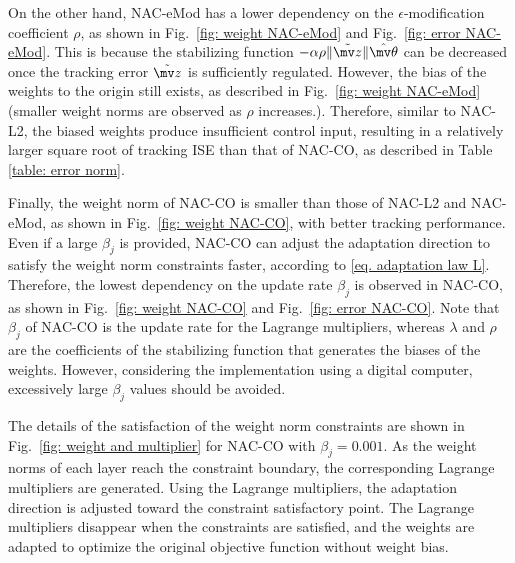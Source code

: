\documentclass[letterpaper, 10 pt, conference]{ieeeconf}  %
\begin{document}
On the other hand, NAC-eMod has a lower dependency on the $\epsilon$-modification coefficient $\rho$, as shown in Fig.~\ref{fig: weight NAC-eMod} and Fig.~\ref{fig: error NAC-eMod}.
This is because the stabilizing function $-\alpha\rho\Vert\tilde {\mv z}\Vert{\hat{\mv\theta}}$ can be decreased once the tracking error $\tilde {\mv z}$ is sufficiently regulated.
However, the bias of the weights to the origin still exists, as described in Fig.~\ref{fig: weight NAC-eMod} (\ie smaller weight norms are observed as $\rho$ increases.).
Therefore, similar to NAC-L2, the biased weights produce insufficient control input, resulting in a relatively larger square root of tracking ISE than that of NAC-CO, as described in Table \ref{table: error norm}.

Finally, the weight norm of NAC-CO is smaller than those of NAC-L2 and NAC-eMod, as shown in Fig.~\ref{fig: weight NAC-CO}, with better tracking performance.
Even if a large $\beta_j$ is provided, NAC-CO can adjust the adaptation direction to satisfy the weight norm constraints faster, according to \eqref{eq. adaptation law L}.
Therefore, the lowest dependency on the update rate $\beta_j$ is observed in NAC-CO, as shown in Fig.~\ref{fig: weight NAC-CO} and Fig.~\ref{fig: error NAC-CO}.
Note that $\beta_j$ of NAC-CO is the update rate for the Lagrange multipliers, whereas $\lambda$ and $\rho$ are the coefficients of the stabilizing function that generates the biases of the weights.
However, considering the implementation using a digital computer, excessively large $\beta_j$ values should be avoided.

The details of the satisfaction of the weight norm constraints are shown in Fig.~\ref{fig: weight and multiplier} for NAC-CO with $\beta_j=0.001$.
As the weight norms of each layer reach the constraint boundary, the corresponding Lagrange multipliers are generated.
Using the Lagrange multipliers, the adaptation direction is adjusted toward the constraint satisfactory point.
The Lagrange multipliers disappear when the constraints are satisfied, and the weights are adapted to optimize the original objective function without weight bias.
\end{document}
